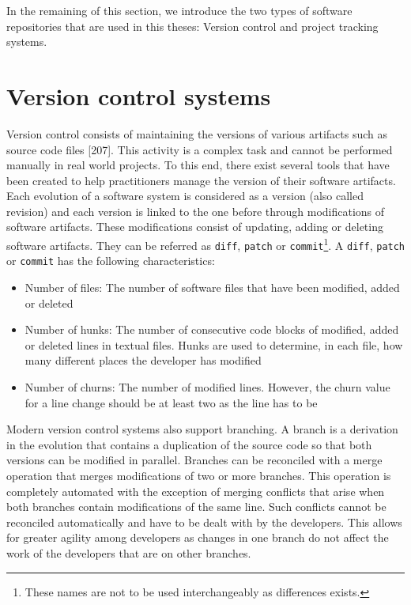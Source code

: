\documentclass[12pt]{report}
\providecommand{\tightlist}{%
  \setlength{\itemsep}{0pt}\setlength{\parskip}{0pt}}
\begin{document}
In the remaining of this section, we introduce the two types of software
repositories that are used in this theses: Version control and project tracking systems.

\section{\texorpdfstring{Version control
systems\label{sec:version-control}}{Version control systems}}\label{version-control-systems}

Version control consists of maintaining the versions of various
artifacts such as source code files {[}207{]}. This activity is a
complex task and cannot be performed manually in real world projects. To
this end, there exist several tools that have been created to help
practitioners manage the version of their software artifacts. Each
evolution of a software system is considered as a version (also called
revision) and each version is linked to the one before through
modifications of software artifacts. These modifications consist of
updating, adding or deleting software artifacts. They can be referred as
\lstinline!diff!, \lstinline!patch! or
\lstinline!commit!\footnote{These names are not to be used interchangeably as differences exists.}.
A \lstinline!diff!, \lstinline!patch! or \lstinline!commit! has the
following characteristics:

\begin{itemize}
\tightlist
\item
  Number of files: The number of software files that have been modified,
  added or deleted
\item
  Number of hunks: The number of consecutive code blocks of modified,
  added or deleted lines in textual files. Hunks are used to determine,
  in each file, how many different places the developer has modified
\item
  Number of churns: The number of modified lines. However, the churn
  value for a line change should be at least two as the line has to be
\end{itemize}

Modern version control systems also support branching. A branch is a
derivation in the evolution that contains a duplication of the source
code so that both versions can be modified in parallel. Branches can be
reconciled with a merge operation that merges modifications of two or
more branches. This operation is completely automated with the exception
of merging conflicts that arise when both branches contain modifications
of the same line. Such conflicts cannot be reconciled automatically and
have to be dealt with by the developers. This allows for greater agility
among developers as changes in one branch do not affect the work of the
developers that are on other branches.
\end{document}
